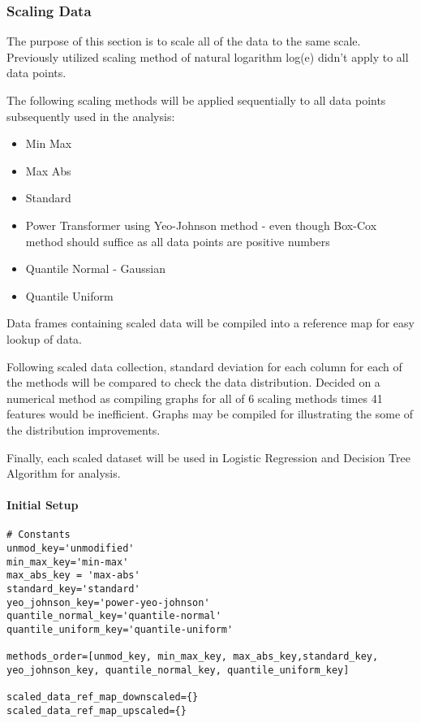 \subsubsection{Scaling Data}
The purpose of this section is to scale all of the data to the same scale. Previously utilized scaling method of natural logarithm log(e) didn't apply to all data points.

The following scaling methods will be applied sequentially to all data points subsequently used in the analysis:
\begin{itemize}
    \item Min Max
    \item Max Abs
    \item Standard
    \item Power Transformer using Yeo-Johnson method - even though Box-Cox method should suffice as all data points are positive numbers
    \item Quantile Normal - Gaussian
    \item Quantile Uniform
\end{itemize}

Data frames containing scaled data will be compiled into a reference map for easy lookup of data.

Following scaled data collection, standard deviation for each column for each of the methods will be compared to check the data distribution. Decided on a numerical method as compiling graphs for all of 6 scaling methods times 41 features would be inefficient. Graphs may be compiled for illustrating the some of the distribution improvements.

Finally, each scaled dataset will be used in Logistic Regression and Decision Tree Algorithm for analysis.
\paragraph{Initial Setup}
\begin{code}
\label{code:scalers:setup}
\begin{verbatim}
# Constants
unmod_key='unmodified'
min_max_key='min-max'
max_abs_key = 'max-abs'
standard_key='standard'
yeo_johnson_key='power-yeo-johnson'
quantile_normal_key='quantile-normal'
quantile_uniform_key='quantile-uniform'

methods_order=[unmod_key, min_max_key, max_abs_key,standard_key, yeo_johnson_key, quantile_normal_key, quantile_uniform_key]

scaled_data_ref_map_downscaled={}
scaled_data_ref_map_upscaled={}
\end{verbatim}
\end{code}
